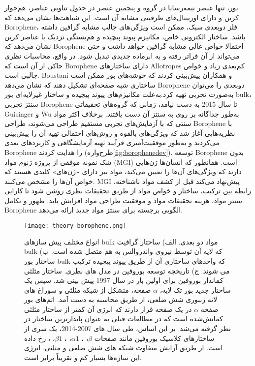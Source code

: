 بور، تنها عنصر نیمه‌رسانا در گروه  و پنجمین عنصر در جدول تناوبی عناصر، هم‌جوار کربن و دارای اوربیتال‌های ظرفیتی مشابه آن است. \cite{forteInitioPredictionBoron2010}این شباهت‌ها نشان می‌دهد که \gls{Borophene}، فلز دوبعدی سبک، ممکن است ویژگی‌های جالب مشابه گرافین داشته باشد. \cite{huangTwoDimensionalBoronPolymorphs2017, liuIntermixingPeriodicSelfassembly2018} ساختار الکترونی خاص، مکانیزم پیوند پیچیده و هم‌بستگی نزدیک با عناصر کربن نشان می‌دهد که \gls{Borophene} احتمالا خواص عالی مشابه گرافین خواهد داشت و حتی می‌تواند از آن فراتر رفته و به ابرماده جدیدی تبدیل شود. در واقع، محاسبات نظری حاکی از آن است که \gls{Borophene} دارای ساختارهای \gls{Allotropes} کم‌بعدی زیاد و خواص جالبی است. \cite{liuBorophenegrapheneHeterostructures2019} \gls{Boustani} و همکاران \cite{boustaniSYSTEMATICLSDINVESTIGATION1994} پیش‌بینی کردند که خوشه‌های بور ممکن است ساختاری شبه صفحه‌ای تشکیل دهند که نشان می‌دهد \gls{Borophene} دوبعدی را می‌توان به‌صورت تجربی تهیه کرد.به‌علت مکانیزم‌های پیوند پیچیده و ساختار غیرلایه‌ای بور \gls{bulk}، سنتز تجربی \gls{Borophene} تا سال 2015 به دست نیامد، زمانی که گروه‌های تحقیقاتی \gls{Guisinger} \cite{mannixSynthesisBorophenesAnisotropic2015} و \gls{Wu} \cite{fengExperimentalRealizationTwodimensional2016} به‌طور جداگانه بر روی  به سنتز آن دست یافتند. برخلاف اکثر مواد سنتی که با آزمایش‌های تجربی مستقیم طراحی می‌شوند، طراحی \gls{Borophene} با نظریه‌هایی آغاز شد که ویژگی‌های بالقوه و روش‌های احتمالی تهیه آن را پیش‌بینی می‌کردند و به‌طور موفقیت‌آمیزی فرآیند تهیه آزمایشگاهی و کاربردهای بعدی \gls{Borophene} را هدایت کردند (طرح‌واره\ref{fig:borophenedev}). توسعه \gls{Borophene} بدون شک نمونه موفقی از پروژه ژنوم مواد (\gls{MGI}) است. همانطور که انسان‌ها ژن‌هایی دارند که ویژگی‌های آن‌ها را تعیین می‌کند، مواد نیز دارای «ژن‌های» کلیدی هستند که خواص آن‌ها را مشخص می‌کنند. \gls{MGI} پیش‌نهاد می‌کند قبل از کشف مواد ناشناخته، رابطه بین ترکیب، ساختار و خواص مواد از طریق تحقیقات نظری روشن شود تا کارایی سنتز مواد، هزینه تحقیقات مواد و موفقیت طراحی مواد افزایش یابد. ظهور و تکامل \gls{Borophene} الگویی برجسته برای سنتز مواد جدید ارائه می‌دهد.
\begin{figure*}
    \centering
    \texttt{[image: theory-borophene.png]}
    \caption{انواع مختلف پیش سازهای \gls{bulk} مواد دو بعدی. الف) ساختار گرافیت \gls{bulk} که لایه آن توسط نیروی واندروالس به هم متصل شده است. ب) ساختار بور \gls{bulk} که واحدهای ساختاری آن از طریق پیوند پیچیده ترکیب می شوند. ج) تاریخچه توسعه بوروفین در مدل های نظری. ساختار مثلثی کماندار بوروفین برای اولین بار در سال 1997 پیش بینی شد. سپس یک ساختار جدید بور تک لایه، $\alpha$-صفحه، متشکل از شبکه مثلثی و سوراخ های لانه زنبوری شش ضلعی، از طریق محاسبه به دست آمد. اتم‌های بور صفحه $\alpha$ در یک صفحه قرار دارند که انرژی آن کمتر از ساختار مثلثی کمانش‌شده است که در مطالعات قبلی به عنوان پایدارترین ساختار در نظر گرفته می‌شد. بر این اساس، طی سال های 2007-2014، یک سری از ساختارهای کلاسیک بوروفین مانند صفحات $\beta$، ، $\alpha 1$، ، $\beta 1$، ،  رخ داده است. از طریق آرایش متفاوت شبکه های شش ضلعی و مثلثی. انرژی این سازه‌ها بسیار کم و تقریباً برابر است.}
    \label{theoryborophene}
\end{figure*}
